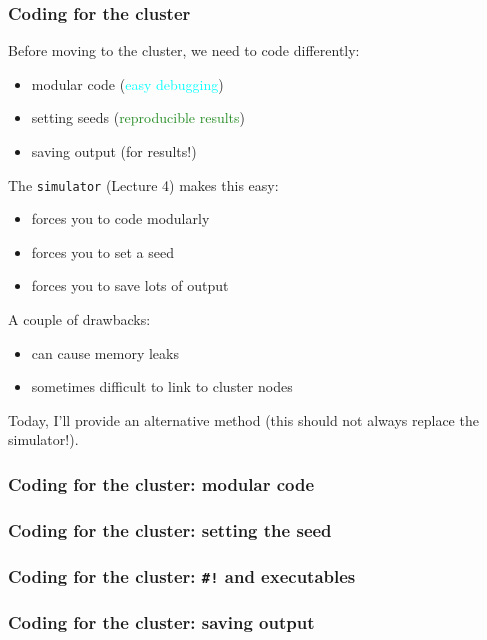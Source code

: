 \documentclass[12pt, 
hyperref={colorlinks=true, linkcolor=BlueViolet, urlcolor=BlueViolet},dvipsnames]{beamer}
\begin{document}
\begin{frame}
\frametitle{Coding for the cluster}
Before moving to the cluster, we need to code differently: \vspace{-0.3cm} \pause
\begin{itemize}
\item modular code \pause (\textcolor{cyan}{easy debugging}) \pause
\item setting seeds \pause (\textcolor{ForestGreen}{reproducible results}) \pause
\item saving output \pause (\textcolor{BurntOrange}{for results!})
\end{itemize}

The \texttt{simulator} (Lecture 4) makes this easy: \vspace{-0.3cm} \pause
\begin{itemize}
\item forces you to code modularly \pause
\item forces you to set a seed \pause
\item forces you to save lots of output \pause
\end{itemize}

A couple of drawbacks: \vspace{-0.3cm} \pause
\begin{itemize}
\item can cause memory leaks \pause
\item sometimes difficult to link to cluster nodes \pause
\end{itemize}

Today, I'll provide an alternative method (this should not always replace the simulator!).
\end{frame}

\begin{frame}
\frametitle{Coding for the cluster: modular code}

\end{frame}

\begin{frame}
\frametitle{Coding for the cluster: setting the seed}

\end{frame}

\begin{frame}
\frametitle{Coding for the cluster: \texttt{\#!} and executables}
\end{frame}

\begin{frame}
\frametitle{Coding for the cluster: saving output}

\end{frame}
\end{document}
